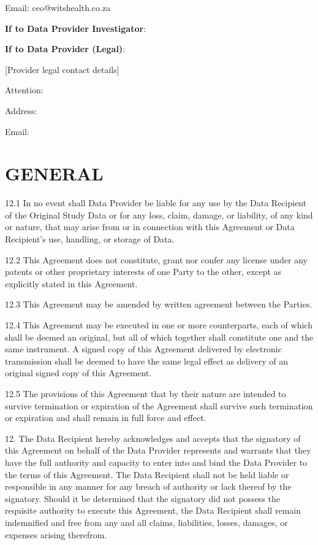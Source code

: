 Email: ceo@witshealth.co.za

\textbf{If to Data Provider Investigator}:

\textbf{If to Data Provider (Legal)}:

[Provider legal contact details]

Attention:

Address:

Email:

\section{GENERAL}

12.1 In no event shall Data Provider be liable for any use by the Data Recipient of the Original Study Data or for any loss, claim, damage, or liability, of any kind or nature, that may arise from or in connection with this Agreement or Data Recipient's use, handling, or storage of Data.

12.2 This Agreement does not constitute, grant nor confer any license under any patents or other proprietary interests of one Party to the other, except as explicitly stated in this Agreement.

12.3 This Agreement may be amended by written agreement between the Parties.

12.4 This Agreement may be executed in one or more counterparts, each of which shall be deemed an original, but all of which together shall constitute one and the same instrument. A signed copy of this Agreement delivered by electronic transmission shall be deemed to have the same legal effect as delivery of an original signed copy of this Agreement.

12.5 The provisions of this Agreement that by their nature are intended to survive termination or expiration of the Agreement shall survive such termination or expiration and shall remain in full force and effect.


12. The Data Recipient hereby acknowledges and accepts that the signatory of this Agreement on behalf of the Data Provider represents and warrants that they have the full authority and capacity to enter into and bind the Data Provider to the terms of this Agreement. The Data Recipient shall not be held liable or responsible in any manner for any breach of authority or lack thereof by the signatory. Should it be determined that the signatory did not possess the requisite authority to execute this Agreement, the Data Recipient shall remain indemnified and free from any and all claims, liabilities, losses, damages, or expenses arising therefrom.

